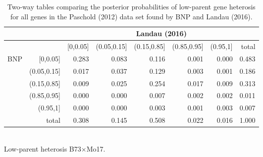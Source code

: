 \begin{itemize}
\begin{table}[ht]
\footnotesize
\centering
\caption{Two-way tables comparing the posterior probabilities of low-parent gene heterosis for all genes in the Paschold (2012) data set found by BNP and Landau (2016).}
\label{bayes-compare1}
\begin{tabular}{rrrrrrr|r}
&  &\multicolumn{6}{c}{Landau (2016)}\\
  \toprule
&  & [0,0.05] & (0.05,0.15] & (0.15,0.85] & (0.85,0.95] & (0.95,1] & total \\
  \midrule
\multirow{6}{*}{BNP} & [0,0.05]    & 0.283 & 0.083 & 0.116 & 0.001 & 0.000 & 0.483 \\
                     & (0.05,0.15] & 0.017 & 0.037 & 0.129 & 0.003 & 0.001 & 0.186 \\
                     & (0.15,0.85] & 0.009 & 0.025 & 0.254 & 0.017 & 0.009 & 0.313 \\
                     & (0.85,0.95] & 0.000 & 0.000 & 0.007 & 0.002 & 0.002 & 0.011 \\
                     & (0.95,1]    & 0.000 & 0.000 & 0.003 & 0.001 & 0.003 & 0.007 \\
                     \midrule
                     & total       & 0.308 & 0.145 & 0.508 & 0.022 & 0.016 & 1.000 \\
   \bottomrule
\end{tabular}
\\[.5cm]
Low-parent heterosis B73$\times$Mo17.
\\[.75cm]


\end{table}
\end{itemize}
